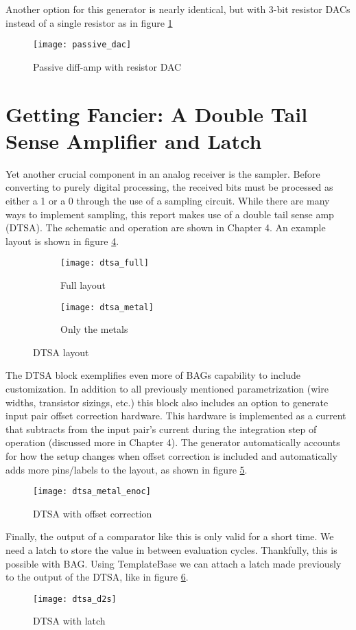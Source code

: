 Another option for this generator is nearly identical, but with 3-bit resistor DACs instead of a single resistor as in figure \ref{fig:passive_dac}
\begin{figure}[h]
\centering
\texttt{[image: passive\_dac]}
\caption{Passive diff-amp with resistor DAC}
\label{fig:passive_dac}
\end{figure}

\section{Getting Fancier: A Double Tail Sense Amplifier and Latch}
Yet another crucial component in an analog receiver is the sampler. Before converting to purely digital processing, the received bits must be processed as either a 1 or a 0 through the use of a sampling circuit. While there are many ways to implement sampling, this report makes use of a double tail sense amp (DTSA). The schematic and operation are shown in Chapter 4. An example layout is shown in figure \ref{fig:dtsa_ex}.
\begin{figure}[h]
\centering
\begin{subfigure}{.4\linewidth}
  \centering
  \texttt{[image: dtsa\_full]}
  \caption{Full layout}
  \label{fig:sfig1}
\end{subfigure}
\begin{subfigure}{.4\linewidth}
  \centering
\texttt{[image: dtsa\_metal]}
  \caption{Only the metals}
  \label{fig:sfig2}
\end{subfigure}
\caption{DTSA layout}
\label{fig:dtsa_ex}
\end{figure}
The DTSA block exemplifies even more of BAGs capability to include customization. In addition to all previously mentioned parametrization (wire widths, transistor sizings, etc.) this block also includes an option to generate input pair offset correction hardware. This hardware is implemented as a current that subtracts from the input pair's current during the integration step of operation (discussed more in  Chapter 4). The generator automatically accounts for how the setup changes when offset correction is included and automatically adds more pins/labels to the layout, as shown in figure \ref{fig:dtsa_enoc}.
\begin{figure}[h]
\centering
\texttt{[image: dtsa\_metal\_enoc]}
\caption{DTSA with offset correction}
\label{fig:dtsa_enoc}
\end{figure}
Finally, the output of a comparator like this is only valid for a short time. We need a latch to store the value in between evaluation cycles. Thankfully, this is possible with BAG. Using TemplateBase we can attach a latch made previously to the output of the DTSA, like in figure \ref{fig:dtsa_d2s}.
\begin{figure}[h]
\centering
\texttt{[image: dtsa\_d2s]}
\caption{DTSA with latch}
\label{fig:dtsa_d2s}
\end{figure}

